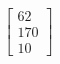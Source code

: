 \documentclass[preview]{standalone}
\begin{document}
\begin{align*}
\begin{bmatrix}62\\170\\10\end{bmatrix}
\end{align*}
\end{document}

